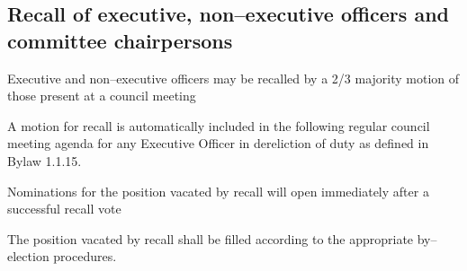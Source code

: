\subsection {Recall of executive, non--executive officers and committee  \hfill \break chairpersons}
\begin{longenum}[ label*=\thesubsection.\arabic*., align=left]
	\item Executive and non--executive officers may be recalled by a 2/3 majority motion of those present at a council meeting
    \item A motion for recall is automatically included in the following regular council meeting agenda for any Executive Officer in dereliction of duty as defined in Bylaw 1.1.15.
    \item Nominations for the position vacated by recall will open immediately after a successful recall vote
    \item The position vacated by recall shall be filled according to the appropriate by--election procedures.
\end{longenum}

